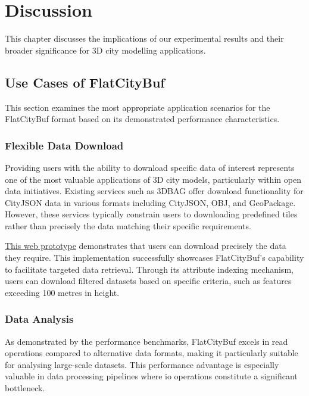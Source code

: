 \chapter{Discussion}
\label{chp:discussion}

This chapter discusses the implications of our experimental results and their broader significance for 3D city modelling applications.

\section{Use Cases of FlatCityBuf}
\label{use_case_flat_city_buffer}

This section examines the most appropriate application scenarios for the FlatCityBuf format based on its demonstrated performance characteristics.

\subsection{Flexible Data Download}
\label{flexible_data_download}

Providing users with the ability to download specific data of interest represents one of the most valuable applications of 3D city models, particularly within open data initiatives. Existing services such as 3DBAG offer download functionality for CityJSON data in various formats including CityJSON, OBJ, and GeoPackage. However, these services typically constrain users to downloading predefined tiles rather than precisely the data matching their specific requirements.

\href{https://fcb-web-prototype.netlify.app}{This web prototype} demonstrates that users can download precisely the data they require. This implementation successfully showcases FlatCityBuf's capability to facilitate targeted data retrieval. Through its attribute indexing mechanism, users can download filtered datasets based on specific criteria, such as features exceeding 100 metres in height.

\subsection{Data Analysis}
\label{data_analysis}

As demonstrated by the performance benchmarks, FlatCityBuf excels in read operations compared to alternative data formats, making it particularly suitable for analysing large-scale datasets. This performance advantage is especially valuable in data processing pipelines where \ac{io} operations constitute a significant bottleneck.

